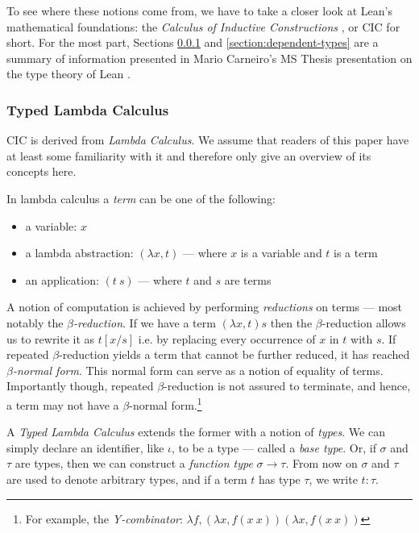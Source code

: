 \noindent To see where these notions come from, we have to take a closer look at Lean's mathematical foundations: 
the \emph{Calculus of Inductive Constructions} \cite{coc, coq}, or CIC for short.
For the most part, Sections \ref{section:typed-lamda-calc} and \ref{section:dependent-types} are a summary of information presented in Mario Carneiro's MS Thesis presentation on the type theory of Lean \cite{mario}.

\subsubsection{Typed Lambda Calculus} 
\label{section:typed-lamda-calc}

CIC is derived from \emph{Lambda Calculus}.
We assume that readers of this paper have at least some familiarity with it and therefore only give an overview of its concepts here.

\vspace{3mm}

\noindent In lambda calculus a \emph{term} can be one of the following:

\begin{itemize}
  \item a variable: $x$
  \item a lambda abstraction: $(\lambda x,t)$ --- where $x$ is a variable and $t$ is a term
  \item an application: $(t\ s)$ --- where $t$ and $s$ are terms
\end{itemize}

\noindent A notion of computation is achieved by performing \emph{reductions} on terms --- most notably the \emph{$\beta$-reduction}.
If we have a term $(\lambda x,t)s$ then the $\beta$-reduction allows us to rewrite it as $t[x/s]$ i.e. by replacing every occurrence of $x$ in $t$ with $s$.
If repeated $\beta$-reduction yields a term that cannot be further reduced, it has reached \emph{$\beta$-normal form}.
This normal form can serve as a notion of equality of terms.
Importantly though, repeated $\beta$-reduction is not assured to terminate, and hence, a term may not have a $\beta$-normal form.\footnote{
  For example, the \emph{Y-combinator}: $\lambda f,(\lambda x, f (x\ x)) (\lambda x, f (x\ x))$
}

\vspace{3mm}

\noindent A \emph{Typed Lambda Calculus} extends the former with a notion of \emph{types}.
We can simply declare an identifier, like $\iota$, to be a type --- called a \emph{base type}.
Or, if $\sigma$ and $\tau$ are types, then we can construct a \emph{function type} $\sigma \to \tau$.
From now on $\sigma$ and $\tau$ are used to denote arbitrary types, and if a term $t$ has type $\tau$, we write $t : \tau$.

